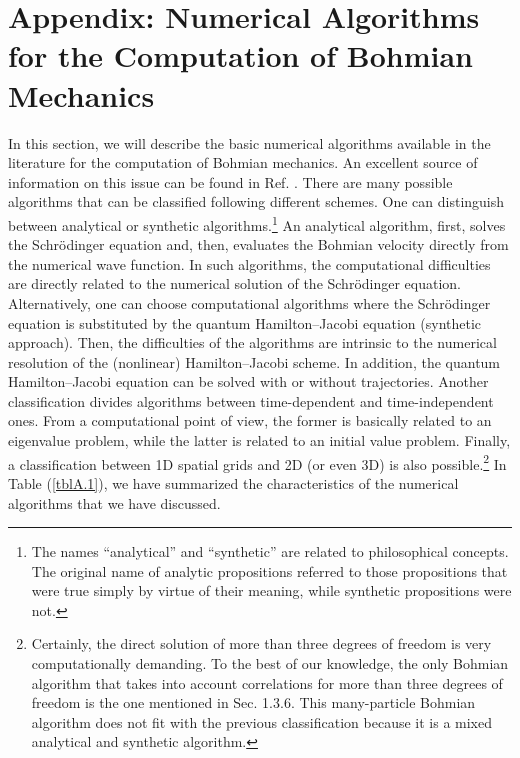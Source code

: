 \documentclass[onecolumn,nofootinbib, secnumarabic, amsmath, nobibnotes,11pt,aps,pra]{revtex4-1}
\newcommand{\tref}[1]{Table (\ref{#1})}
\begin{document}
\section[Appendix]{Appendix: Numerical Algorithms for the Computation of Bohmian Mechanics}\label{om.sec_comput}

In this section, we will describe the basic numerical algorithms
available in the literature for the computation of Bohmian
mechanics. An excellent source of information on this issue can be
found in Ref. \cite{om.wyatt2005}. There are many possible
algorithms that can be classified following different schemes.
One can distinguish between analytical or synthetic algorithms.\footnote{The names ``analytical'' and ``synthetic'' are related to philosophical concepts. The original name of analytic propositions referred to those propositions that were true simply by virtue of their meaning, while synthetic propositions were not.}
An analytical algorithm, first, solves the Schr\"odinger equation and, then, evaluates the Bohmian velocity directly from the numerical wave function. In such algorithms, the computational difficulties are directly related to the numerical solution of the Schr\"odinger equation. Alternatively, one can choose computational algorithms where the Schr\"odinger equation is substituted by the quantum Hamilton--Jacobi equation (synthetic approach). Then, the difficulties of the algorithms are intrinsic to the numerical resolution of the (nonlinear) Hamilton--Jacobi scheme. In addition,
the quantum Hamilton--Jacobi equation can be solved with or without trajectories. Another classification divides
algorithms between time-dependent and time-independent ones. From a computational point of view, the
former is basically related to an eigenvalue problem, while the latter is related to an initial
value problem. Finally, a classification between 1D spatial grids and 2D (or even 3D)
is also possible.\footnote{Certainly, the direct solution of more than three degrees of freedom is very computationally demanding. To the best of our knowledge, the only Bohmian algorithm that takes into account correlations for more than three degrees of freedom is the one mentioned in Sec. 1.3.6.     
This many-particle Bohmian algorithm does not fit with the previous
classification because it is a mixed analytical and synthetic
algorithm.} In \tref{tblA.1}, we have summarized the characteristics
of the numerical algorithms that we have discussed.
\end{document}
